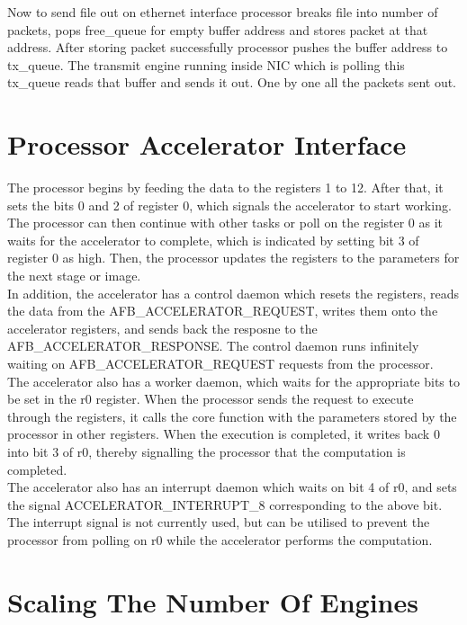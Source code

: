 \documentclass[a4paper,12pt, final]{report}
\begin{document}
Now to send file out on ethernet interface processor breaks file into number of packets, pops free\_queue for empty buffer address and stores packet at that address. After storing packet successfully processor pushes the buffer address to tx\_queue. The transmit engine running inside NIC which is polling this tx\_queue reads that buffer and sends it out. One by one all the packets sent out.


\section{Processor Accelerator Interface}

The processor begins by feeding the data to the registers 1 to 12. After that, it sets the bits 0 and 2 of register 0, which signals the accelerator to start working. The processor can then continue with other tasks or poll on the register 0 as it waits for the accelerator to complete, which is indicated by setting bit 3 of register 0 as high. Then, the processor updates the registers to the parameters for the next stage or image.
\\

In addition, the accelerator has a control daemon which resets the registers, reads the data from the AFB\_ACCELERATOR\_REQUEST, writes them onto the accelerator registers, and sends back the resposne to the AFB\_ACCELERATOR\_RESPONSE. The control daemon runs infinitely waiting on AFB\_ACCELERATOR\_REQUEST requests from the processor.
\\

The accelerator also has a worker daemon, which waits for the appropriate bits to be set in the r0 register. When the processor sends the request to execute through the registers, it calls the core function with the parameters stored by the processor in other registers. When the execution is completed, it writes back 0 into bit 3 of r0, thereby signalling the processor that the computation is completed.
\\

The accelerator also has an interrupt daemon which waits on bit 4 of r0, and sets the signal ACCELERATOR\_INTERRUPT\_8 corresponding to the above bit. The interrupt signal is not currently used, but can be utilised to prevent the processor from polling on r0 while the accelerator performs the computation.
\\


\section{Scaling The Number Of Engines}\label{sec:scale_eng}
\end{document}
